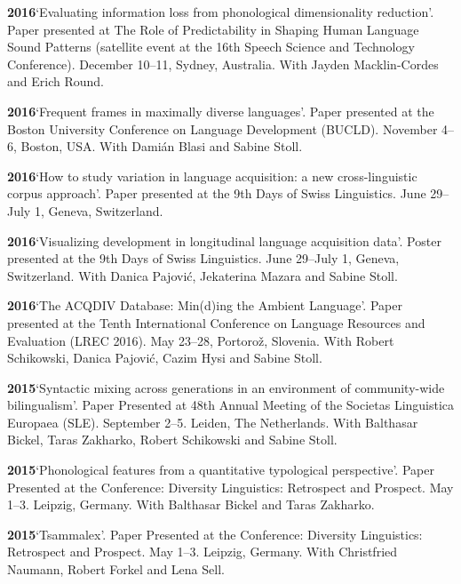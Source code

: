 \documentclass[11pt]{article}
\newcommand{\hangpara}{
 \setlength{\parindent}{0in} %
 \hangindent=0.42in %
}
\begin{document}
\vskip 6pt
\hangpara
{\bf 2016}\hspace{1ex}`Evaluating information loss from phonological dimensionality reduction'. Paper presented at The Role of Predictability in Shaping Human Language Sound Patterns (satellite event at the 16th Speech Science and Technology Conference). December 10--11, Sydney, Australia. With Jayden Macklin-Cordes and Erich Round.

\vskip 6pt
\hangpara
{\bf 2016}\hspace{1ex}`Frequent frames in maximally diverse languages'. Paper presented at the Boston University Conference on Language Development (BUCLD). November 4--6, Boston, USA. With Dami{\'a}n Blasi and Sabine Stoll.

\vskip 6pt
\hangpara
{\bf 2016}\hspace{1ex}`How to study variation in language acquisition: a new cross-linguistic corpus approach'. Paper presented at the 9th Days of Swiss Linguistics. June 29--July 1, Geneva, Switzerland.

\vskip 6pt
\hangpara
{\bf 2016}\hspace{1ex}`Visualizing development in longitudinal language acquisition data'. Poster presented at the 9th Days of Swiss Linguistics. June 29--July 1, Geneva, Switzerland. With Danica Pajovi{\'c}, Jekaterina Mazara and Sabine Stoll.

\vskip 6pt
\hangpara
{\bf 2016}\hspace{1ex}`The ACQDIV Database: Min(d)ing the Ambient Language'. Paper presented at the Tenth International Conference on Language Resources and Evaluation (LREC 2016). May 23--28, Portoro{\v z}, Slovenia. With Robert Schikowski, Danica Pajovi{\'c}, Cazim Hysi and Sabine Stoll.

\vskip 6pt
\hangpara
{\bf 2015}\hspace{1ex}`Syntactic mixing across generations in an environment of community-wide bilingualism'. Paper Presented at 48th Annual Meeting of the Societas Linguistica Europaea (SLE). September 2--5. Leiden, The Netherlands. With Balthasar Bickel, Taras Zakharko, Robert Schikowski and Sabine Stoll.

\vskip 6pt
\hangpara
{\bf 2015}\hspace{1ex}`Phonological features from a quantitative typological perspective'. Paper Presented at the Conference: Diversity Linguistics: Retrospect and Prospect. May 1--3. Leipzig, Germany. With Balthasar Bickel and Taras Zakharko.

\vskip 6pt
\hangpara
{\bf 2015}\hspace{1ex}`Tsammalex'. Paper Presented at the Conference: Diversity Linguistics: Retrospect and Prospect. May 1--3. Leipzig, Germany. With Christfried Naumann, Robert Forkel and Lena Sell.
\end{document}
